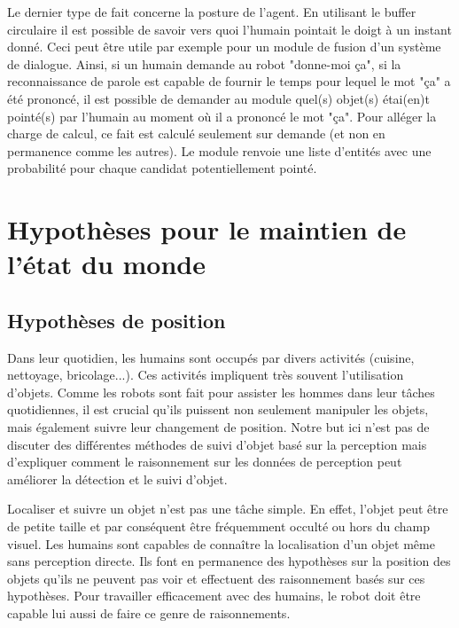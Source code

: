 \documentclass[a4paper,11pt,twoside]{StyleThese}
\begin{document}
Le dernier type de fait concerne la posture de l'agent. En utilisant le buffer circulaire il est possible de savoir vers quoi l'humain pointait le doigt à un instant donné. Ceci peut être utile par exemple pour un module de fusion d'un système de dialogue. Ainsi, si un humain demande au robot "donne-moi ça", si la reconnaissance de parole est capable de fournir le temps pour lequel le mot "ça" a été prononcé, il est possible de demander au module quel(s) objet(s) étai(en)t pointé(s) par l'humain au moment où il a prononcé le mot "ça". Pour alléger la charge de calcul, ce fait est calculé seulement sur demande (et non en permanence comme les autres). Le module renvoie une liste d'entités avec une probabilité pour chaque candidat potentiellement pointé.




\section{Hypothèses pour le maintien de l'état du monde}
\label{sec:hypo}
\subsection{Hypothèses de position}


Dans leur quotidien, les humains sont occupés par divers activités (cuisine, nettoyage, bricolage...). Ces activités impliquent très souvent l'utilisation d'objets. Comme les robots sont fait pour assister les hommes dans leur tâches quotidiennes, il est crucial qu'ils puissent non seulement manipuler les objets, mais également suivre leur changement de position. Notre but ici n'est pas de discuter des différentes méthodes de suivi d'objet basé sur la perception mais d'expliquer comment le raisonnement sur les données de perception peut améliorer la détection et le suivi d'objet.

Localiser et suivre un objet n'est pas une tâche simple. En effet, l'objet peut être de petite taille et par conséquent être fréquemment occulté ou hors du champ visuel.
Les humains sont capables de connaître la localisation d'un objet même sans perception directe. Ils font en permanence des hypothèses sur la position des objets qu'ils ne peuvent pas voir et effectuent des raisonnement basés sur ces hypothèses. Pour travailler efficacement avec des humains, le robot doit être capable lui aussi de faire ce genre de raisonnements.
\end{document}
